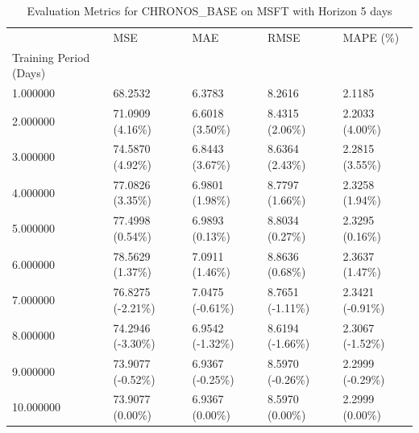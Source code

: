 \begin{table}
\caption{Evaluation Metrics for CHRONOS_BASE on MSFT with Horizon 5 days}
\label{tab:chronos_base_MSFT_h5_metrics}
\begin{tabular}{lllll}
\toprule
 & MSE & MAE & RMSE & MAPE (\%) \\
Training Period (Days) &  &  &  &  \\
\midrule
1.000000 & 68.2532 & 6.3783 & 8.2616 & 2.1185 \\
2.000000 & 71.0909 (4.16\%) & 6.6018 (3.50\%) & 8.4315 (2.06\%) & 2.2033 (4.00\%) \\
3.000000 & 74.5870 (4.92\%) & 6.8443 (3.67\%) & 8.6364 (2.43\%) & 2.2815 (3.55\%) \\
4.000000 & 77.0826 (3.35\%) & 6.9801 (1.98\%) & 8.7797 (1.66\%) & 2.3258 (1.94\%) \\
5.000000 & 77.4998 (0.54\%) & 6.9893 (0.13\%) & 8.8034 (0.27\%) & 2.3295 (0.16\%) \\
6.000000 & 78.5629 (1.37\%) & 7.0911 (1.46\%) & 8.8636 (0.68\%) & 2.3637 (1.47\%) \\
7.000000 & 76.8275 (-2.21\%) & 7.0475 (-0.61\%) & 8.7651 (-1.11\%) & 2.3421 (-0.91\%) \\
8.000000 & 74.2946 (-3.30\%) & 6.9542 (-1.32\%) & 8.6194 (-1.66\%) & 2.3067 (-1.52\%) \\
9.000000 & 73.9077 (-0.52\%) & 6.9367 (-0.25\%) & 8.5970 (-0.26\%) & 2.2999 (-0.29\%) \\
10.000000 & 73.9077 (0.00\%) & 6.9367 (0.00\%) & 8.5970 (0.00\%) & 2.2999 (0.00\%) \\
\bottomrule
\end{tabular}
\end{table}

